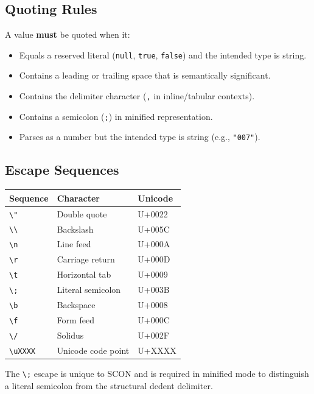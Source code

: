 \documentclass[11pt, a4paper]{article}
\begin{document}
\subsection{Quoting Rules}
\label{sec:quoting}

A value \textbf{must} be quoted when it:
\begin{itemize}
\item Equals a reserved literal (\texttt{null}, \texttt{true}, \texttt{false})
      and the intended type is string.
\item Contains a leading or trailing space that is semantically significant.
\item Contains the delimiter character (\texttt{,} in inline/tabular contexts).
\item Contains a semicolon (\texttt{;}) in minified representation.
\item Parses as a number but the intended type is string (e.g., \texttt{"007"}).
\end{itemize}

\subsection{Escape Sequences}
\label{sec:escapes}

\begin{tabular}{lll}
\toprule
Sequence & Character & Unicode \\
\midrule
\texttt{\textbackslash"} & Double quote & U+0022 \\
\texttt{\textbackslash\textbackslash} & Backslash & U+005C \\
\texttt{\textbackslash n} & Line feed & U+000A \\
\texttt{\textbackslash r} & Carriage return & U+000D \\
\texttt{\textbackslash t} & Horizontal tab & U+0009 \\
\texttt{\textbackslash ;} & Literal semicolon & U+003B \\
\texttt{\textbackslash b} & Backspace & U+0008 \\
\texttt{\textbackslash f} & Form feed & U+000C \\
\texttt{\textbackslash /} & Solidus & U+002F \\
\texttt{\textbackslash uXXXX} & Unicode code point & U+XXXX \\
\bottomrule
\end{tabular}

\medskip
\noindent The \texttt{\textbackslash ;} escape is unique to SCON and is required
in minified mode to distinguish a literal semicolon from the structural dedent
delimiter.
\end{document}
